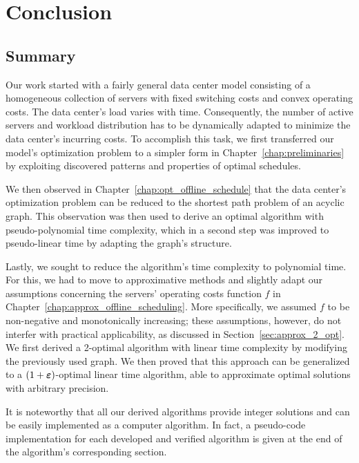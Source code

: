 
\chapter{Conclusion}\label{chap:conclusion}

\section{Summary}
Our work started with a fairly general data center model consisting of a homogeneous collection of servers with fixed switching costs and convex operating costs. The data center's load varies with time. Consequently, the number of active servers and workload distribution has to be dynamically adapted to minimize the data center's incurring costs. To accomplish this task, we first transferred our model's optimization problem to a simpler form in Chapter~\ref{chap:preliminaries} by exploiting discovered patterns and properties of optimal schedules. 

We then observed in Chapter~\ref{chap:opt_offline_schedule} that the data center's optimization problem can be reduced to the shortest path problem of an acyclic graph. This observation was then used to derive an optimal algorithm with pseudo-polynomial time complexity, which in a second step was improved to pseudo-linear time by adapting the graph's structure.

Lastly, we sought to reduce the algorithm's time complexity to polynomial time. For this, we had to move to approximative methods and slightly adapt our assumptions concerning the servers' operating costs function $f$ in Chapter~\ref{chap:approx_offline_scheduling}. More specifically, we assumed $f$ to be non-negative and monotonically increasing; these assumptions, however, do not interfer with practical applicability, as discussed in Section~\ref{sec:approx_2_opt}. We first derived a 2-optimal algorithm with linear time complexity by modifying the previously used graph. We then proved that this approach can be generalized to a $(1+\boldsymbol\varepsilon)$-optimal linear time algorithm, able to approximate optimal solutions with arbitrary precision.

It is noteworthy that all our derived algorithms provide integer solutions and can be easily implemented as a computer algorithm. In fact, a pseudo-code implementation for each developed and verified algorithm is given at the end of the algorithm's corresponding section.

